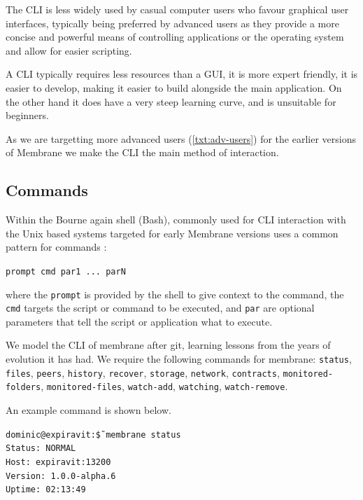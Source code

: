 \documentclass[11pt, a4paper, twocolumn, twoside]{report}
\def\code#1{\texttt{#1}}
\begin{document}
The CLI is less widely used by casual computer users who favour graphical user interfaces, typically being preferred by advanced users as they provide a more concise and powerful means of controlling applications or the operating system and allow for easier scripting.

A CLI typically requires less resources than a GUI, it is more expert friendly, it is easier to develop, making it easier to build alongside the main application. On the other hand it does have a very steep learning curve, and is unsuitable for beginners.

As we are targetting more advanced users (\ref{txt:adv-users}) for the earlier versions of Membrane we make the CLI the main method of interaction.

\subsection{Commands}

Within the Bourne again shell (Bash), commonly used for CLI interaction with the Unix based systems targeted for early Membrane versions uses a common pattern for commands \citep{gnu2016man}:

\begin{displayquote}
 \code{prompt cmd par1 ... parN}
\end{displayquote}

where the \code{prompt} is provided by the shell to give context to the command, the \code{cmd} targets the script or command to be executed, and \code{par} are optional parameters that tell the script or application what to execute.

We model the CLI of membrane after git, learning lessons from the years of evolution it has had. We require the following commands for membrane: \code{status}, \code{files}, \code{peers}, \code{history}, \code{recover}, \code{storage}, \code{network}, \code{contracts}, \code{monitored-folders}, \code{monitored-files}, \code{watch-add}, \code{watching}, \code{watch-remove}.

An example command is shown below.

\begin{displayquote}
 \scriptsize
 \code{dominic@expiravit:\~\$ membrane status} \\
 \code{Status:         NORMAL} \\
 \code{Host:           expiravit:13200} \\
 \code{Version:        1.0.0-alpha.6} \\
 \code{Uptime:         02:13:49}
\end{displayquote}
\end{document}
